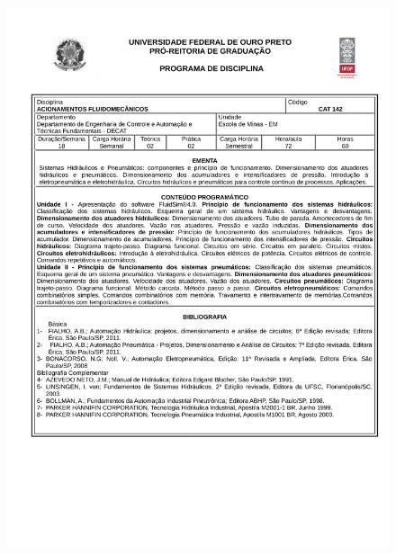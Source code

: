 \begin{figure}[p]
	\centering 
	\includegraphics[scale=0.7]{capitulos/anexo1-programas-disciplina/p81.pdf}
\end{figure}

